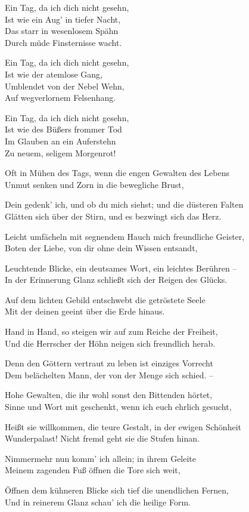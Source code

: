 \begin{liebesgedicht}
Ein Tag, da ich dich nicht gesehn,\\
Ist wie ein Aug' in tiefer Nacht,\\
Das starr in wesenlosem Spähn\\
Durch müde Finsternisse wacht.

Ein Tag, da ich dich nicht gesehn,\\
Ist wie der atemlose Gang,\\
Umblendet von der Nebel Wehn,\\
Auf wegverlornem Felsenhang.

Ein Tag, da ich dich nicht gesehn,\\
Ist wie des Büßers frommer Tod\\
Im Glauben an ein Auferstehn\\
Zu neuem, seligem Morgenrot!
\end{liebesgedicht}

\begin{liebesgedicht}
Oft in Mühen des Tags, wenn die engen Gewalten des Lebens\\
Unmut senken und Zorn in die bewegliche Brust,

Dein gedenk' ich, und ob du mich siehst; und die düsteren Falten\\
Glätten sich über der Stirn, und es bezwingt sich das Herz.

Leicht umfächeln mit segnendem Hauch mich freundliche Geister,\\
Boten der Liebe, von dir ohne dein Wissen entsandt,

Leuchtende Blicke, ein deutsames Wort, ein leichtes Berühren –\\
In der Erinnerung Glanz schließt sich der Reigen des Glücks.

Auf dem lichten Gebild entschwebt die getröstete Seele\\
Mit der deinen geeint über die Erde hinaus.

Hand in Hand, so steigen wir auf zum Reiche der Freiheit,\\
Und die Herrscher der Höhn neigen sich freundlich herab.

Denn den Göttern vertraut zu leben ist einziges Vorrecht\\
Dem belächelten Mann, der von der Menge sich schied. –

Hohe Gewalten, die ihr wohl sonst den Bittenden hörtet,\\
Sinne und Wort mit geschenkt, wenn ich euch ehrlich gesucht,

Heißt sie willkommen, die teure Gestalt, in der ewigen Schönheit\\
Wunderpalast! Nicht fremd geht sie die Stufen hinan.

Nimmermehr nun komm' ich allein; in ihrem Geleite\\
Meinem zagenden Fuß öffnen die Tore sich weit,

Öffnen dem kühneren Blicke sich tief die unendlichen Fernen,\\
Und in reinerem Glanz schau' ich die heilige Form.
\end{liebesgedicht}


